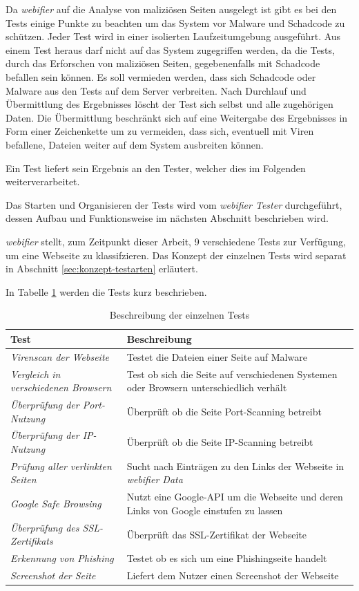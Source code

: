 Da \textit{webifier} auf die Analyse von maliziösen Seiten ausgelegt ist gibt es bei den Tests
einige Punkte zu beachten um das System vor Malware und Schadcode zu schützen.
Jeder Test wird in einer isolierten Laufzeitumgebung ausgeführt. Aus einem Test
heraus darf nicht auf das System zugegriffen werden, da die Tests, durch das Erforschen von
maliziösen Seiten, gegebenenfalls mit Schadcode befallen sein können. Es soll vermieden werden,
dass sich Schadcode oder Malware aus den Tests auf dem Server verbreiten. Nach Durchlauf und
Übermittlung des Ergebnisses löscht der Test sich selbst und alle zugehörigen Daten. Die
Übermittlung beschränkt sich auf eine Weitergabe des Ergebnisses in Form einer Zeichenkette um zu
vermeiden, dass sich, eventuell mit Viren befallene, Dateien weiter auf dem System ausbreiten
können.

Ein Test liefert sein Ergebnis an den Tester, welcher dies im Folgenden weiterverarbeitet.

Das Starten und Organisieren der Tests wird vom \textit{webifier Tester} durchgeführt, dessen
Aufbau und Funktionsweise im nächsten Abschnitt beschrieben wird.

\textit{webifier} stellt, zum Zeitpunkt dieser Arbeit, 9 verschiedene Tests zur Verfügung, um eine Webseite zu
klassifzieren.
Das Konzept der einzelnen Tests wird separat in Abschnitt
\ref{sec:konzept-testarten} erläutert.

In Tabelle \ref{tbl:tests} werden die Tests kurz beschrieben.

\begin{table}[H]
\centering
\begin{tabularx}{\textwidth}{|l|X|}
\hline
\textbf{Test} & \textbf{Beschreibung} \\\hline
\textit{Virenscan der Webseite} & Testet die Dateien einer Seite auf Malware \\\hline
\textit{Vergleich in verschiedenen Browsern} & Test ob sich die Seite auf verschiedenen Systemen
oder Browsern unterschiedlich verhält \\\hline
\textit{Überprüfung der Port-Nutzung} & Überprüft ob die Seite Port-Scanning betreibt \\\hline
\textit{Überprüfung der IP-Nutzung} & Überprüft ob die Seite IP-Scanning betreibt \\\hline
\textit{Prüfung aller verlinkten Seiten} & Sucht nach Einträgen zu den Links der Webseite
in \textit{webifier Data} \\\hline
\textit{Google Safe Browsing} & Nutzt eine Google-API um die Webseite und deren Links von Google
einstufen zu lassen \\\hline
\textit{Überprüfung des SSL-Zertifikats} & Überprüft das \acs{SSL}-Zertifikat der Webseite \\\hline
\textit{Erkennung von Phishing} & Testet ob es sich um eine Phishingseite handelt \\\hline
\textit{Screenshot der Seite} & Liefert dem Nutzer einen Screenshot der Webseite \\\hline
\end{tabularx}
\caption{Beschreibung der einzelnen Tests}
\label{tbl:tests}
\end{table}

